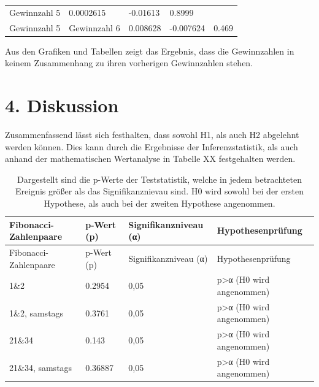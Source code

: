 \documentclass[ngerman,]{article}
\begin{document}
\begin{longtable}[]{@{}lllll@{}}
\begin{minipage}[t]{0.19\columnwidth}
Gewinnzahl 5\strut
\end{minipage} & \begin{minipage}[t]{0.19\columnwidth}\raggedright\strut
0.0002615\strut
\end{minipage} & \begin{minipage}[t]{0.19\columnwidth}\raggedright\strut
-0.01613\strut
\end{minipage} & \begin{minipage}[t]{0.07\columnwidth}\raggedright\strut
0.8999\strut
\end{minipage}\tabularnewline
\begin{minipage}[t]{0.23\columnwidth}\raggedright\strut
Gewinnzahl 5\strut
\end{minipage} & \begin{minipage}[t]{0.19\columnwidth}\raggedright\strut
Gewinnzahl 6\strut
\end{minipage} & \begin{minipage}[t]{0.19\columnwidth}\raggedright\strut
0.008628\strut
\end{minipage} & \begin{minipage}[t]{0.19\columnwidth}\raggedright\strut
-0.007624\strut
\end{minipage} & \begin{minipage}[t]{0.07\columnwidth}\raggedright\strut
0.469\strut
\end{minipage}\tabularnewline
\bottomrule
\end{longtable}

Aus den Grafiken und Tabellen zeigt das Ergebnis, dass die Gewinnzahlen
in keinem Zusammenhang zu ihren vorherigen Gewinnzahlen stehen.

\section{4. Diskussion}\label{diskussion}

Zusammenfassend lässt sich festhalten, dass sowohl H1, als auch H2
abgelehnt werden können. Dies kann durch die Ergebnisse der
Inferenzstatistik, als auch anhand der mathematischen Wertanalyse in
Tabelle XX festgehalten werden.

\begin{longtable}[]{@{}llll@{}}
\caption{Dargestellt sind die p-Werte der Teststatistik, welche in jedem
betrachteten Ereignis größer als das Signifikanznievau sind. H0 wird
sowohl bei der ersten Hypothese, als auch bei der zweiten Hypothese
angenommen.}\tabularnewline
\toprule
Fibonacci-Zahlenpaare & p-Wert (p) & Signifikanzniveau (α) &
Hypothesenprüfung\tabularnewline
\midrule
\endfirsthead
\toprule
Fibonacci-Zahlenpaare & p-Wert (p) & Signifikanzniveau (α) &
Hypothesenprüfung\tabularnewline
\midrule
\endhead
1\&2 & 0.2954 & 0,05 & p\textgreater{}α (H0 wird
angenommen)\tabularnewline
1\&2, samstags & 0.3761 & 0,05 & p\textgreater{}α (H0 wird
angenommen)\tabularnewline
21\&34 & 0.143 & 0,05 & p\textgreater{}α (H0 wird
angenommen)\tabularnewline
21\&34, samstags & 0.36887 & 0,05 & p\textgreater{}α (H0 wird
angenommen)\tabularnewline
\bottomrule
\end{longtable}
\end{document}
